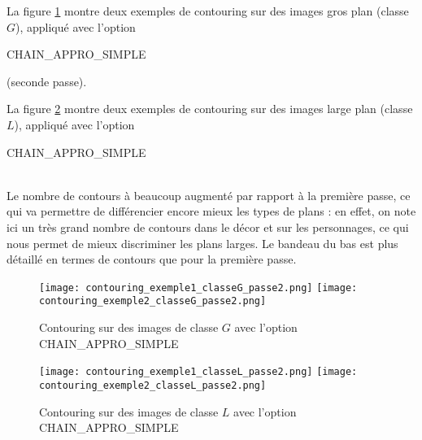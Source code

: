 \documentclass{book}
\begin{document}
La figure \ref{contouringG2} montre deux exemples de contouring sur des images \og gros plan \fg{} (classe $G$), appliqué
avec l'option \begin{itshape}CHAIN\_APPRO\_SIMPLE\end{itshape} (seconde passe).

La figure \ref{contouringL2} montre deux 
exemples de contouring sur des images \og large plan \fg{} (classe $L$), appliqué avec 
l'option \begin{itshape}CHAIN\_APPRO\_SIMPLE\end{itshape}\\


Le nombre de contours à beaucoup augmenté par rapport à la première passe, ce qui va permettre de différencier encore mieux 
les types de plans : en effet, on note ici un très grand nombre de contours dans le décor et sur les personnages, ce qui nous permet de 
mieux discriminer les plans larges.
Le bandeau du bas est plus détaillé en termes de contours que pour la première passe.

\begin{figure}[H]
\begin{center}
\texttt{[image: contouring\_exemple1\_classeG\_passe2.png]}
\texttt{[image: contouring\_exemple2\_classeG\_passe2.png]}
\end{center}
\caption{Contouring sur des images de classe $G$ avec l'option CHAIN\_APPRO\_SIMPLE}
\label{contouringG2}
\end{figure}

\begin{figure}[H]
\begin{center}
\texttt{[image: contouring\_exemple1\_classeL\_passe2.png]}
\texttt{[image: contouring\_exemple2\_classeL\_passe2.png]}
\end{center}
\caption{Contouring sur des images de classe $L$ avec l'option CHAIN\_APPRO\_SIMPLE}
\label{contouringL2}
\end{figure}
\end{document}
